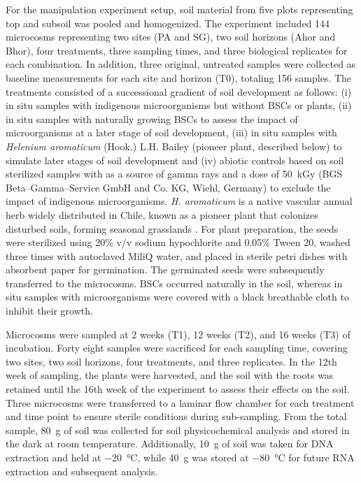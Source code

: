 For the manipulation experiment setup, soil material from five plots representing top and subsoil was pooled and homogenized. The experiment included 144 microcosms representing two sites (PA and SG), two soil horizons (Ahor and Bhor), four treatments, three sampling times, and three biological replicates for each combination. In addition, three original, untreated samples were collected as baseline measurements for each site and horizon (T0), totaling 156 samples. The treatments consisted of a successional gradient of soil development as follows: (i) in situ samples with indigenous microorganisms but without BSCs or plants, (ii) in situ samples with naturally growing BSCs to assess the impact of microorganisms at a later stage of soil development, (iii) in situ samples with \textit{Helenium aromaticum} (Hook.) L.H. Bailey (pioneer plant, described below) to simulate later stages of soil development and (iv) abiotic controls based on soil sterilized samples with  as a source of gamma rays and a dose of \SI{50}{\kilo Gy} (BGS Beta–Gamma–Service GmbH and Co. KG, Wiehl, Germany) to exclude the impact of indigenous microorganisms. \textit{H. aromaticum} is a native vascular annual herb widely distributed in Chile, known as a pioneer plant that colonizes disturbed soils, forming seasonal grasslands \citep{GomezGonzalez2011}. For plant preparation, the seeds were sterilized using 20\% v/v sodium hypochlorite and 0.05\% Tween 20, washed three times with autoclaved MiliQ water, and placed in sterile petri dishes with absorbent paper for germination. The germinated seeds were subsequently transferred to the microcosms. BSCs occurred naturally in the soil, whereas in situ samples with microorganisms were covered with a black breathable cloth to inhibit their growth.

Microcosms were sampled at 2 weeks (T1), 12 weeks (T2), and 16 weeks (T3) of incubation. Forty eight samples were sacrificed for each sampling time, covering two sites, two soil horizons, four treatments, and three replicates. In the 12th week of sampling, the plants were harvested, and the soil with the roots was retained until the 16th week of the experiment to assess their effects on the soil. Three microcosms were transferred to a laminar flow chamber for each treatment and time point to ensure sterile conditions during sub-sampling. From the total sample, \SI{80}{\gram} of soil was collected for soil physicochemical analysis and stored in the dark at room temperature. Additionally, \SI{10}{\gram} of soil was taken for DNA extraction and held at \SI{-20}{\degreeCelsius}, while \SI{40}{\gram} was stored at \SI{-80}{\degreeCelsius} for future RNA extraction and subsequent analysis.

